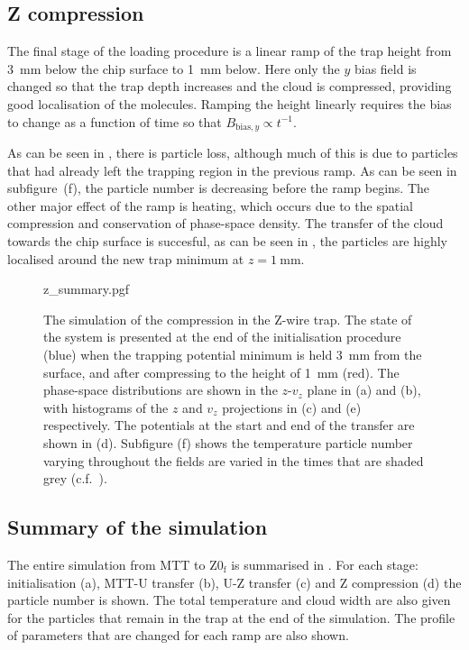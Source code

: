 \subsection{Z compression}

The final stage of the loading procedure is a linear ramp of the trap height
from \SI{3}{\milli\meter} below the chip surface to \SI{1}{\milli\meter} below.
Here only the $y$ bias field is changed so  that the trap depth
increases and the cloud is compressed, providing good localisation of the
molecules. Ramping the height linearly requires the bias to change as a
function of time so that $B_{\text{bias}, y} \propto t^{-1}$.

As can be seen in , there is particle loss,
although much of this is due to particles that had already left the trapping
region in the previous ramp. As can be seen in subfigure~(f), the particle
number is decreasing before the ramp begins. The other major effect of the ramp
is heating, which occurs due to the spatial compression and conservation of
phase-space density.
%
The transfer of the cloud towards the chip surface is succesful, as can be seen
in , the particles are highly localised around the
new trap minimum at $z=\SI{1}{\milli\meter}$.

\begin{figure}[p]
\centering
  {z_summary.pgf}
  \caption{
    The simulation of the compression in the Z-wire trap. The state of the
    system is presented at the end of the initialisation procedure (blue) when
    the trapping potential minimum is held \SI{3}{\milli\meter} from the
    surface, and after compressing to the height of \SI{1}{\milli\meter} (red).
    The phase-space distributions are shown in the $z$-$v_z$ plane in (a) and
    (b), with histograms of the $z$ and $v_z$ projections in (c) and (e)
    respectively. The potentials at the start and end of the transfer are shown
    in (d). Subfigure (f) shows the temperature particle number varying
    throughout the fields are varied in the times that are shaded grey
    (c.f.~).
  }
  \label{sim:fig:zsim}
\end{figure}

\subsection{Summary of the simulation}

The entire simulation from MTT to $\mathrm{Z0_f}$ is summarised in
. For each stage: initialisation (a), MTT-U
transfer (b), U-Z transfer (c) and Z compression (d) the particle number is
shown. The total temperature and cloud width are also given for the particles
that remain in the trap at the end of the simulation. The profile of parameters
that are changed for each ramp are also shown. 


